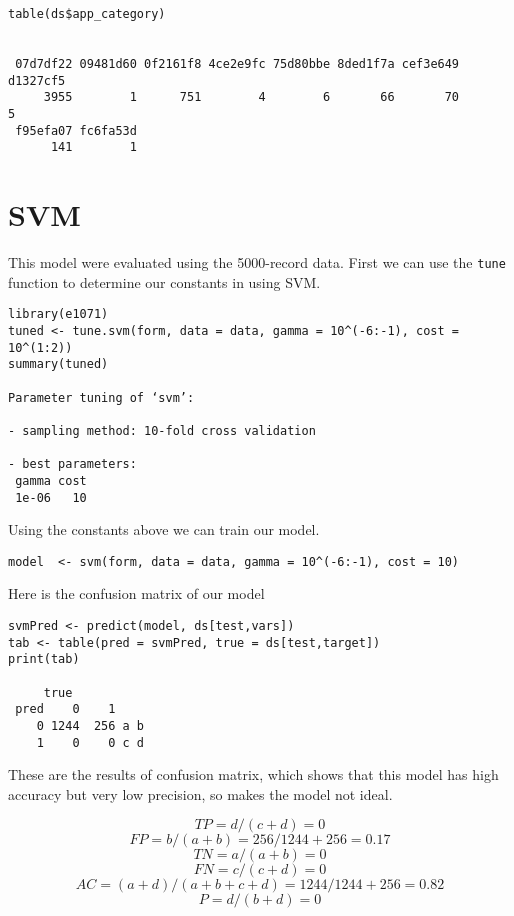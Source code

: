\documentclass[11pt,a4paper]{article}
\begin{document}
\begin{verbatim}
table(ds$app_category)


 07d7df22 09481d60 0f2161f8 4ce2e9fc 75d80bbe 8ded1f7a cef3e649 d1327cf5 
     3955        1      751        4        6       66       70        5 
 f95efa07 fc6fa53d 
      141        1
\end{verbatim}

\section{SVM}
\label{sec-4}
This model were evaluated using the 5000-record data.
First we can use the \texttt{tune} function to determine our constants in using SVM.

\begin{verbatim}
library(e1071)
tuned <- tune.svm(form, data = data, gamma = 10^(-6:-1), cost = 10^(1:2))
summary(tuned)

Parameter tuning of ‘svm’:

- sampling method: 10-fold cross validation 

- best parameters:
 gamma cost
 1e-06   10
\end{verbatim}

Using the constants above we can train our model.

\begin{verbatim}
model  <- svm(form, data = data, gamma = 10^(-6:-1), cost = 10)
\end{verbatim}

Here is the confusion matrix of our model

\begin{verbatim}
svmPred <- predict(model, ds[test,vars])
tab <- table(pred = svmPred, true = ds[test,target])
print(tab)

     true
 pred    0    1
    0 1244  256 a b
    1    0    0 c d
\end{verbatim}

These are the results of confusion matrix, which shows that
this model has high accuracy but very low precision, so makes
the model not ideal.

$$TP = d / (c+d) = 0$$
$$FP = b / (a+b) = 256 / 1244 + 256 = 0.17$$
$$TN = a / (a+b) = 0$$
$$FN = c / (c+d) = 0$$
$$AC=(a+d)/(a+b+c+d) = 1244 / 1244+256 = 0.82$$
$$P = d / (b+d) = 0$$
\end{document}
